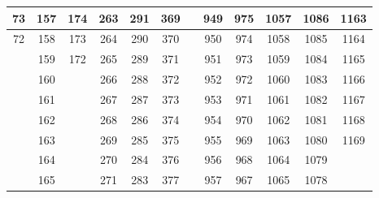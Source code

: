 \begin{center}
{\begin{tabular} {| c | c | c | c | c | c | c | c | c | c | c | c | }
 73                      & 157                      &  174 & 263 & 291                      & 369                      &     & 949                      &  975                      & 1057 & 1086                       & 1163                      \\ \hline
 72                      & 158                      &  173 & 264 & 290                      & 370                      &     & 950                      &  974                      & 1058 & 1085                       & 1164                      \\ \hline
                         & 159                      &  172 & 265 & 289                      & 371                      &     & 951                      &  973                      & 1059 & 1084                       & 1165                      \\ \hline
                         & 160                      &      & 266 & 288                      & 372                      &     & 952                      &  972                      & 1060 & 1083                       & 1166                      \\ \hline
                         & 161                      &      & 267 & 287                      & 373                      &     & 953                      &  971                      & 1061 & 1082                       & 1167                      \\ \hline
                         & 162                      &      & 268 & 286                      & 374                      &     & 954                      &  970                      & 1062 & 1081                       & 1168                      \\ \hline
                         & 163                      &      & 269 & 285                      & 375                      &     & 955                      &  969                      & 1063 & 1080                       & 1169                      \\ \hline
                         & 164                      &      & 270 & 284                      & 376                      &     & 956                      &  968                      & 1064 & 1079                       &                           \\ \hline
                         & 165                      &      & 271 & 283                      & 377                      &     & 957                      &  967                      & 1065 & 1078                       &                           \\ \hline

\end{tabular}}
\end{center}
